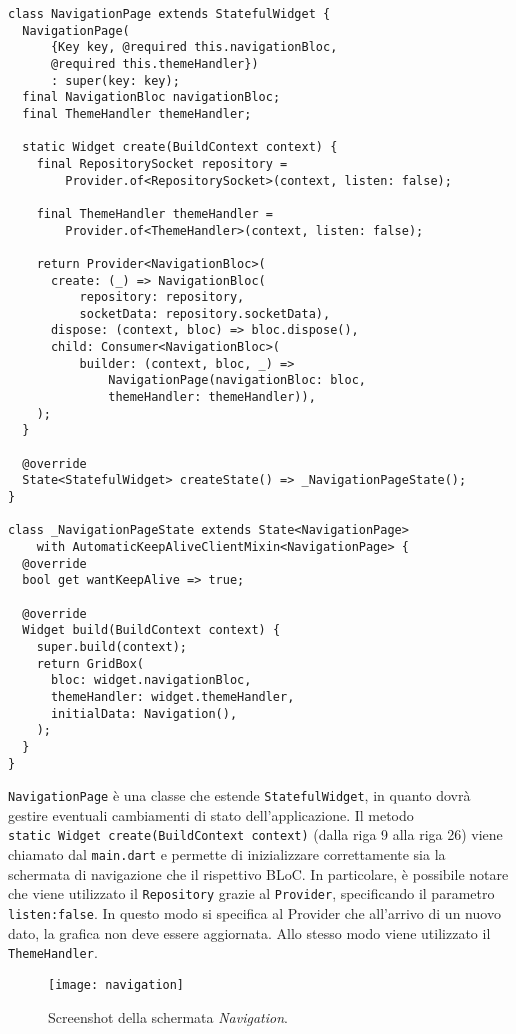 \begin{lstlisting}
class NavigationPage extends StatefulWidget {
  NavigationPage(
      {Key key, @required this.navigationBloc, 
      @required this.themeHandler})
      : super(key: key);
  final NavigationBloc navigationBloc;
  final ThemeHandler themeHandler;

  static Widget create(BuildContext context) {
    final RepositorySocket repository =
        Provider.of<RepositorySocket>(context, listen: false);

    final ThemeHandler themeHandler =
        Provider.of<ThemeHandler>(context, listen: false);

    return Provider<NavigationBloc>(
      create: (_) => NavigationBloc(
          repository: repository, 
          socketData: repository.socketData),
      dispose: (context, bloc) => bloc.dispose(),
      child: Consumer<NavigationBloc>(
          builder: (context, bloc, _) =>
              NavigationPage(navigationBloc: bloc, 
              themeHandler: themeHandler)),
    );
  }

  @override
  State<StatefulWidget> createState() => _NavigationPageState();
}

class _NavigationPageState extends State<NavigationPage>
    with AutomaticKeepAliveClientMixin<NavigationPage> {
  @override
  bool get wantKeepAlive => true;

  @override
  Widget build(BuildContext context) {
    super.build(context);
    return GridBox(
      bloc: widget.navigationBloc,
      themeHandler: widget.themeHandler,
      initialData: Navigation(),
    );
  }
}
\end{lstlisting}

\verb|NavigationPage| è una classe che estende \verb|StatefulWidget|, in quanto dovrà gestire eventuali cambiamenti di stato dell'applicazione. Il metodo \\ \verb|static Widget create(BuildContext context)| (dalla riga 9 alla riga 26) viene chiamato dal \verb|main.dart| e permette di inizializzare correttamente sia la schermata di navigazione che il rispettivo BLoC. In particolare, è possibile notare che viene utilizzato il \verb|Repository| grazie al \verb|Provider|, specificando il parametro \verb|listen:false|. In questo modo si specifica al Provider che all'arrivo di un nuovo dato, la grafica non deve essere aggiornata. Allo stesso modo viene utilizzato il \verb|ThemeHandler|.

\begin{figure}
	\begin{center}
		\texttt{[image: navigation]}
		\caption[Screenshot - Navigation]{Screenshot della schermata \textit{Navigation}.}
		\label{figura:navigation}
	\end{center}
\end{figure}

